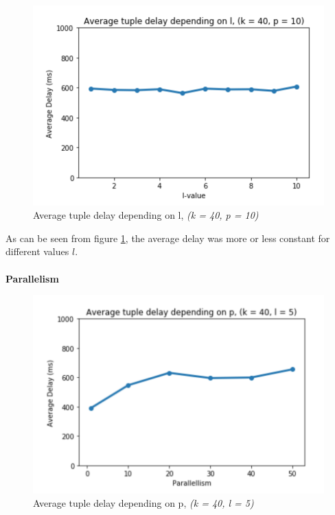 \begin{figure}[H]
    \centering
    \includegraphics[scale=0.8]{Images/l-values.png}
    \caption{Average tuple delay depending on l, \textit{(k = 40, p = 10)}}
    \label{fig:lvalues}
\end{figure}

\noindent As can be seen from figure \ref{fig:lvalues}, the average delay was more or less constant for different values $l$.\\
\\
\textbf{Parallelism} \\%

\begin{figure}[H]
    \centering
    \includegraphics[scale=0.8]{Images/p-values.png}
    \caption{Average tuple delay depending on p, \textit{(k = 40, l = 5)}}
    \label{fig:pvalues}
\end{figure}


